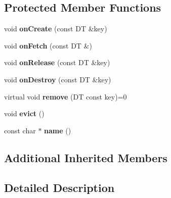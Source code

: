 \subsection*{Protected Member Functions}
\begin{DoxyCompactItemize}
\item 
\hypertarget{classLoki_1_1EvictLRU_a5982a28a470f49676881bb05ec2f2760}{}void {\bfseries on\+Create} (const D\+T \&key)\label{classLoki_1_1EvictLRU_a5982a28a470f49676881bb05ec2f2760}

\item 
\hypertarget{classLoki_1_1EvictLRU_abc7f4d133d366dfa1f141c990e29cd16}{}void {\bfseries on\+Fetch} (const D\+T \&)\label{classLoki_1_1EvictLRU_abc7f4d133d366dfa1f141c990e29cd16}

\item 
\hypertarget{classLoki_1_1EvictLRU_a8a2a0c1becb607a5c3147e7e17571180}{}void {\bfseries on\+Release} (const D\+T \&key)\label{classLoki_1_1EvictLRU_a8a2a0c1becb607a5c3147e7e17571180}

\item 
\hypertarget{classLoki_1_1EvictLRU_a25b762e1f387bc962c92eba6d771a71a}{}void {\bfseries on\+Destroy} (const D\+T \&key)\label{classLoki_1_1EvictLRU_a25b762e1f387bc962c92eba6d771a71a}

\item 
\hypertarget{classLoki_1_1EvictLRU_aca96d1b85e1a8199f44463ce81076cf2}{}virtual void {\bfseries remove} (D\+T const key)=0\label{classLoki_1_1EvictLRU_aca96d1b85e1a8199f44463ce81076cf2}

\item 
\hypertarget{classLoki_1_1EvictLRU_a096fa684040eec490b15adc51a262a05}{}void {\bfseries evict} ()\label{classLoki_1_1EvictLRU_a096fa684040eec490b15adc51a262a05}

\item 
\hypertarget{classLoki_1_1EvictLRU_a8f3587ef1de88468975d87a88a94faf2}{}const char $\ast$ {\bfseries name} ()\label{classLoki_1_1EvictLRU_a8f3587ef1de88468975d87a88a94faf2}

\end{DoxyCompactItemize}
\subsection*{Additional Inherited Members}


\subsection{Detailed Description}
